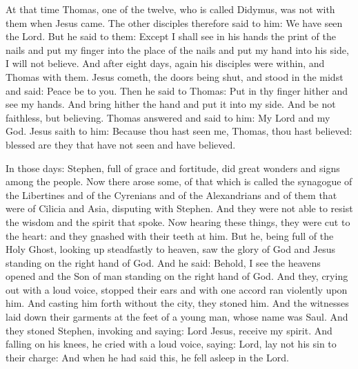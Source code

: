 
At that time Thomas, one of the twelve, who is called Didymus, was not
with them when Jesus came.
The other disciples therefore said to him: We have seen the Lord.
But he said to them: Except I shall see in his hands the print of the
nails and put my finger into the place of the nails and put my hand into
his side, I will not believe.
And after eight days, again his disciples were within, and Thomas
with them. Jesus cometh, the doors being shut, and stood in the midst
and said: Peace be to you.
Then he said to Thomas: Put in thy finger hither and see my
hands. And bring hither the hand and put it into my side.  And be not
faithless, but believing.
Thomas answered and said to him: My Lord and my God.
Jesus saith to him: Because thou hast seen me, Thomas, thou hast
believed: blessed are they that have not seen and have believed.





In those days: Stephen, full of grace and fortitude, did great wonders and
signs among the people.
Now there arose some, of that which is called the synagogue of the
Libertines and of the Cyrenians and of the Alexandrians and of them that
were of Cilicia and Asia, disputing with Stephen.
And they were not able to resist the wisdom and the spirit that
spoke.
Now hearing these things, they were cut to the heart: and they
gnashed with their teeth at him.
But he, being full of the Holy Ghost, looking up steadfastly to
heaven, saw the glory of God and Jesus standing on the right hand of
God. And he said: Behold, I see the heavens opened and the Son of man
standing on the right hand of God.
And they, crying out with a loud voice, stopped their ears and
with one accord ran violently upon him.
And casting him forth without the city, they stoned him.  And the
witnesses laid down their garments at the feet of a young man, whose
name was Saul.
And they stoned Stephen, invoking and saying: Lord Jesus, receive
my spirit.
And falling on his knees, he cried with a loud voice, saying:
Lord, lay not his sin to their charge: And when he had said this, he
fell asleep in the Lord. %




